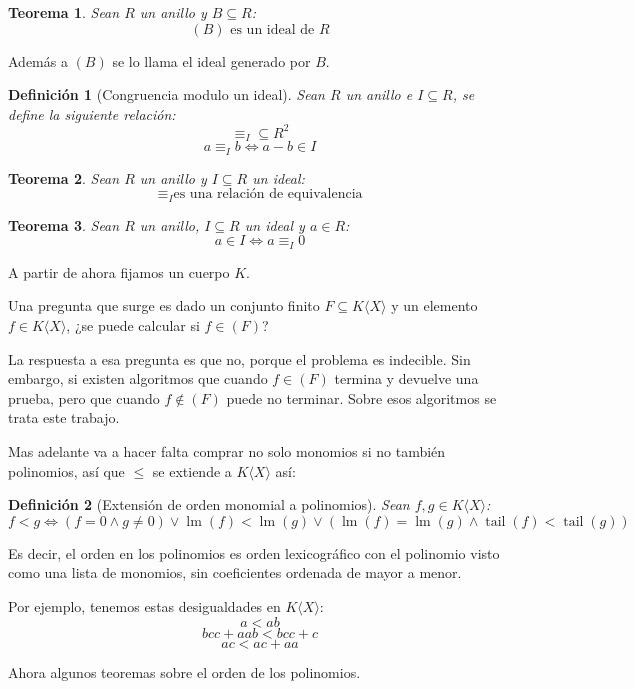 \documentclass[fleqn]{amsbook} %
\theoremstyle{customstyle}
\newtheorem{definition}{Definición}[section]
\newtheorem{theorem}{Teorema}[section]
\DeclareMathOperator{\lm}{lm}
\DeclareMathOperator{\tail}{tail}
\begin{document}
\begin{theorem}
Sean $R$ un anillo y $B ⊆ R$:
\[ (B)\text{ es un ideal de }R \]

\end{theorem}

Además a $(B)$ se lo llama el ideal generado por $B$.

\begin{definition}[Congruencia modulo un ideal]\label{def:congruencia mod ideal}
Sean $R$ un anillo e $I ⊆ R$, se define la siguiente relación:
\[ ≡_I ⊆ R^2 \]
\[ a ≡_I b ⇔ a - b ∈ I \]
\end{definition}

\begin{theorem}\label{thm:congruencia mod ideal es equivalencia}
Sean $R$ un anillo y $I ⊆ R$ un ideal:
\[ ≡_I \text{es una relación de equivalencia} \]
\end{theorem}

\begin{theorem}\label{thm:en ideal ⇔ congruente 0}
Sean $R$ un anillo, $I ⊆ R$ un ideal y $a ∈ R$:
\[ a ∈ I ⇔ a ≡_I 0 \]
\end{theorem}


A partir de ahora fijamos un cuerpo $K$.

Una pregunta que surge es dado un conjunto finito $F ⊆ K⟨X⟩$ y un elemento $f ∈ K⟨X⟩$, ¿se puede calcular si $f ∈ (F)$?

La respuesta a esa pregunta es que no, porque el problema es indecible. Sin embargo, si existen algoritmos que cuando $f ∈ (F)$ termina y devuelve una prueba, pero que cuando $f ∉ (F)$ puede no terminar. Sobre esos algoritmos se trata este trabajo.

Mas adelante va a hacer falta comprar no solo monomios si no también polinomios, así que $≤$ se extiende a $K⟨X⟩$ así:

\begin{definition}[Extensión de orden monomial a polinomios]
Sean $f, g ∈  K⟨X⟩$:
\[ f < g ⇔ (f = 0 ∧ g ≠ 0) ∨ \lm(f) < \lm(g) ∨ (\lm(f) = \lm(g) ∧ \tail(f) < \tail(g)) \]
\end{definition}

Es decir, el orden en los polinomios es orden lexicográfico con el polinomio visto como una lista de monomios, sin coeficientes ordenada de mayor a menor.

Por ejemplo, tenemos estas desigualdades en $K⟨X⟩$:
\[ a < ab \]
\[ bcc + aab < bcc + c \]
\[ ac < ac + aa \]

Ahora algunos teoremas sobre el orden de los polinomios.
\end{document}

